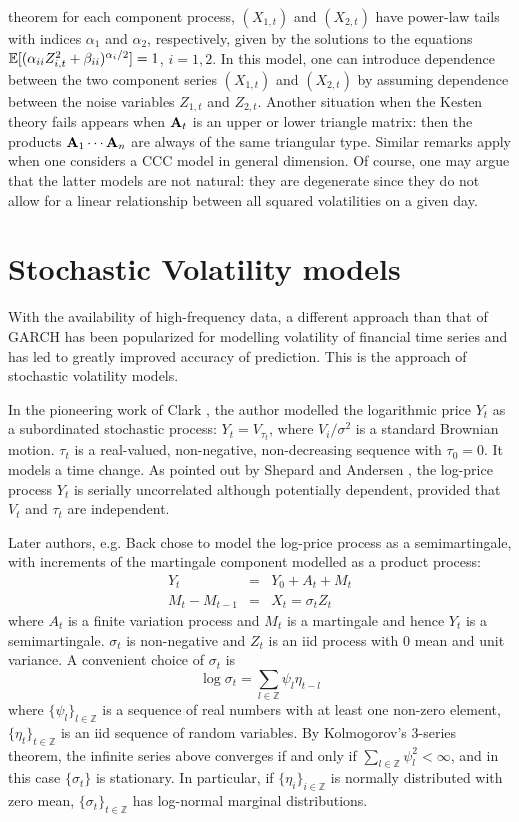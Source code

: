 theorem for each component process, $(X_{1,t})$ and $(X_{2,t})$ have
power-law tails  with indices $\alpha_1$ and $\alpha_2$, respectively,
given by the solutions to the equations  $\mathbb{E} [(\alpha_{ii}
Z_{i,t}^2+\beta_{ii})^{\alpha_i/2}]=1$, $i=1,2$. In this model, one
can introduce dependence between the two component series $(X_{1,t})$
and $(X_{2,t})$ by assuming dependence between the noise variables
$Z_{1,t}$ and $Z_{2,t}$. Another situation when the Kesten theory fails 
appears when ${\mathbf A}_t$ is an upper or lower triangle matrix: then the
products  ${\mathbf A}_1\cdots{\mathbf A}_n$ are always of the same triangular
type. 
Similar remarks apply when one considers a CCC model in general
dimension. Of course, one may argue that the latter models 
are not natural: they are degenerate since they do not allow 
for a linear relationship between all squared volatilities on a given
day.

\section{Stochastic Volatility models}
With the availability of high-frequency data, a different approach
than that of GARCH has been popularized for modelling volatility of
financial time series and has led to greatly improved accuracy of
prediction. This is the approach of stochastic volatility models.

In the pioneering work of Clark \cite{clark:1973}, the author modelled
the logarithmic price $Y_t$ as a subordinated stochastic process:
$Y_t = V_{\tau_t}$, where $V_i/\sigma^2$ is a standard Brownian
motion. $\tau_t$ is a real-valued, non-negative, non-decreasing
sequence with $\tau_0 = 0$. It models a time change. As pointed out by
Shepard and Andersen \cite{Shephard:Andersen:2009}, the log-price
process $Y_t$ is serially uncorrelated although potentially dependent,
provided that $V_t$ and $\tau_t$ are independent.

Later authors, e.g. Back \cite{back:1991} chose to model the log-price
process as a semimartingale, with increments of the martingale
component modelled as a product process:
\begin{eqnarray}
  Y_t &=& Y_0 + A_t + M_t \nonumber \\
  M_t - M_{t-1} &=& X_t = \sigma_t Z_t
  \label{eq:rtght}
\end{eqnarray}
where $A_t$ is a finite variation process and $M_t$ is a martingale
and hence $Y_t$ is a semimartingale. $\sigma_t$ is non-negative and
$Z_t$ is an iid process with 0 mean and unit variance. A convenient
choice of $\sigma_t$ is
\begin{equation}
  \label{eq:rfht}
  \log\sigma_t = \sum_{l \in \mathbb Z} \psi_l \eta_{t-l}  
\end{equation}
where $\{\psi_l\}_{l \in \mathbb Z}$ is a sequence of real numbers
with at least one non-zero element,
$\{\eta_t\}_{t \in \mathbb Z}$ is an iid sequence of random
variables. By Kolmogorov's 3-series theorem, the infinite series above
converges if and only if $\sum_{l \in \mathbb Z} \psi_l^2 < \infty$,
and in this case $\{\sigma_{t}\}$ is stationary.
In particular, if $\{\eta_i\}_{i \in \mathbb Z}$ is normally
distributed with zero mean, $\{\sigma_t\}_{t \in \mathbb Z}$ has
log-normal marginal distributions.

